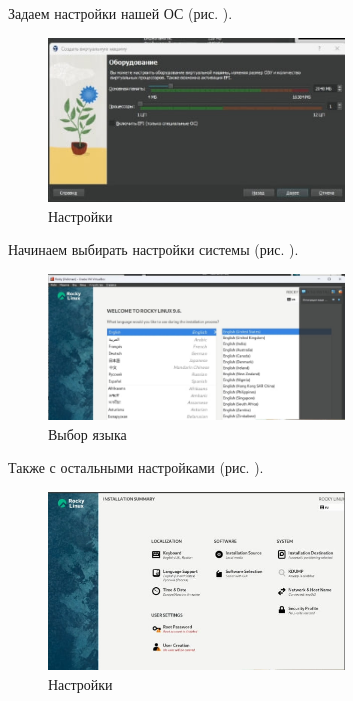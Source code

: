 \documentclass[
  12pt,
  a4paper,
  DIV=11,
  numbers=noendperiod]{scrreprt}
\begin{document}
Задаем настройки нашей ОС (рис. \autocite*{fig:002}).

\begin{figure}

{\centering \includegraphics[width=0.7\textwidth,height=\textheight]{image/2.jpg}

}

\caption{Настройки}

\end{figure}%

Начинаем выбирать настройки системы (рис. \autocite*{fig:003}).

\begin{figure}

{\centering \includegraphics[width=0.7\textwidth,height=\textheight]{image/3.jpg}

}

\caption{Выбор языка}

\end{figure}%

Также с остальными настройками (рис. \autocite*{fig:004}).

\begin{figure}

{\centering \includegraphics[width=0.7\textwidth,height=\textheight]{image/4.jpg}

}

\caption{Настройки}

\end{figure}%
\end{document}
